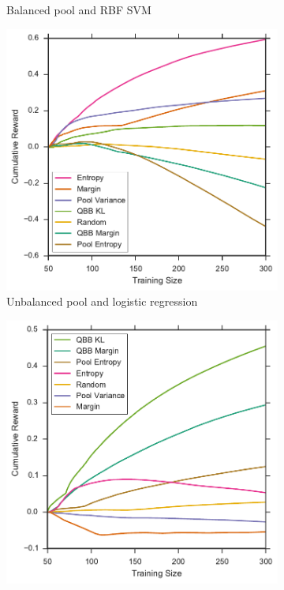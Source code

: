 \begin{figure}[p]
\begin{subfigure}{.5\textwidth}
		\caption{Balanced pool and RBF SVM}
		\label{fig:vstatlas_br_sum_rewards}
	\end{subfigure}
	\begin{subfigure}{.5\textwidth}
		\centering
		\includegraphics[width=\textwidth]{figures/5_thompson/vstatlas_ul_sum_rewards}
		\caption{Unbalanced pool and logistic regression}
		\label{fig:vstatlas_ul_sum_rewards}
	\end{subfigure}%
	\begin{subfigure}{.5\textwidth}
		\centering
		\includegraphics[width=\linewidth]{figures/5_thompson/vstatlas_ur_sum_rewards}

\end{subfigure}
\end{figure}
